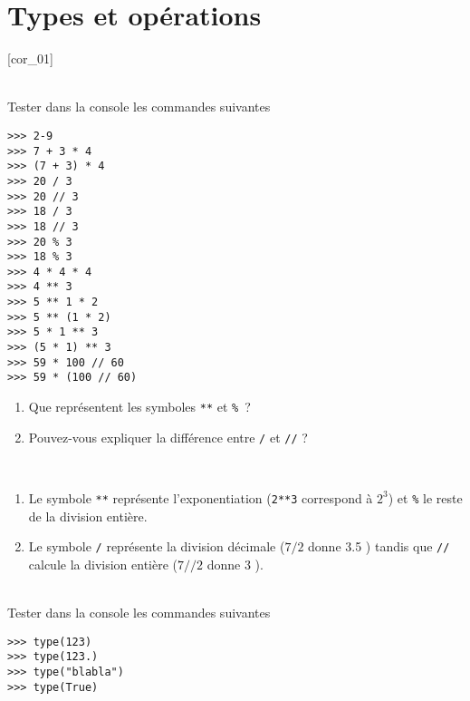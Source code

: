 \documentclass[a4paper,12pt]{article}
\newcommand{\numero}{1}                                    %
\begin{document}


\setcounter{section}{\numero}
\section{Types et opérations}				
[cor_01]

\exo{}  ~\\ 
Tester dans la console \py les commandes suivantes
\begin{multicols}{3}
	\begin{lstlisting}[numbers=none]
>>> 2-9
>>> 7 + 3 * 4
>>> (7 + 3) * 4
>>> 20 / 3
>>> 20 // 3
>>> 18 / 3
>>> 18 // 3
>>> 20 % 3
>>> 18 % 3
>>> 4 * 4 * 4
>>> 4 ** 3
>>> 5 ** 1 * 2
>>> 5 ** (1 * 2)
>>> 5 * 1 ** 3
>>> (5 * 1) ** 3
>>> 59 * 100 // 60
>>> 59 * (100 // 60)
	\end{lstlisting}
\end{multicols}
\begin{enumerate}
	\item Que représentent les symboles \lstinline{**} et \lstinline{%} ?
		\item Pouvez-vous expliquer la différence entre \lstinline{/} et \lstinline{//} ?\\
	\end{enumerate}

	\begin{correction}
		~\\ 
		\begin{enumerate}
	\item Le symbole \lstinline{**} représente l'exponentiation (\lstinline{2**3} correspond à $2^3$) et \lstinline{%} le reste de la division entière.
	\item Le symbole \lstinline{/} représente la division décimale ($7/2$ donne 3.5 ) tandis que \lstinline{//} calcule la division entière ($7//2$ donne 3 ).
 		\end{enumerate}
	\end{correction}
\finexo

\exo{}  ~\\ 
Tester dans la console \py les commandes suivantes
\begin{lstlisting}[numbers=none]
>>> type(123)
>>> type(123.)
>>> type("blabla")
>>> type(True)
\end{lstlisting}
\end{document}
